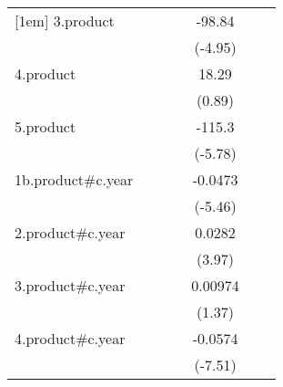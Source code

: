 {\begin{tabular}{l*{6}{c}}
[1em]
3.product           &                     &                     &                     &      -98.84\sym{***}&                     &                     \\
                    &                     &                     &                     &     (-4.95)         &                     &                     \\
[1em]
4.product           &                     &                     &                     &       18.29         &                     &                     \\
                    &                     &                     &                     &      (0.89)         &                     &                     \\
[1em]
5.product           &                     &                     &                     &      -115.3\sym{***}&                     &                     \\
                    &                     &                     &                     &     (-5.78)         &                     &                     \\
[1em]
1b.product#c.year   &                     &                     &                     &     -0.0473\sym{***}&                     &                     \\
                    &                     &                     &                     &     (-5.46)         &                     &                     \\
[1em]
2.product#c.year    &                     &                     &                     &      0.0282\sym{***}&                     &                     \\
                    &                     &                     &                     &      (3.97)         &                     &                     \\
[1em]
3.product#c.year    &                     &                     &                     &     0.00974         &                     &                     \\
                    &                     &                     &                     &      (1.37)         &                     &                     \\
[1em]
4.product#c.year    &                     &                     &                     &     -0.0574\sym{***}&                     &                     \\
                    &                     &                     &                     &     (-7.51)         &                     &                     \\

\end{tabular}}
